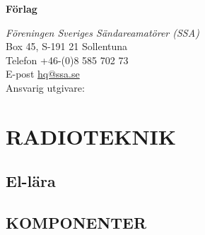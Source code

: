 \documentclass[a4paper,twoside,openright]{book}
\begin{document}

\vfill

\noindent
\textbf{Förlag}

\noindent
\textit{Föreningen Sveriges Sändareamatörer (SSA)}\\
Box 45, S-191 21 Sollentuna\\
Telefon +46-(0)8 585 702 73\\
E-post \href{mailto:hq@ssa.se}{hq@ssa.se}\\[\baselineskip]

\noindent
Ansvarig utgivare:\\

\cleardoublepage
\pagestyle{fancy}


\tableofcontents

\setlength{\parindent}{0px}
\setlength{\parskip}{1ex plus 0.5ex minus 0.2ex}

\mainmatter

%




\part{RADIOTEKNIK}
\chapter{El-lära}
\label{ellära}











\chapter{KOMPONENTER}
\label{komponenter}










\end{document}
